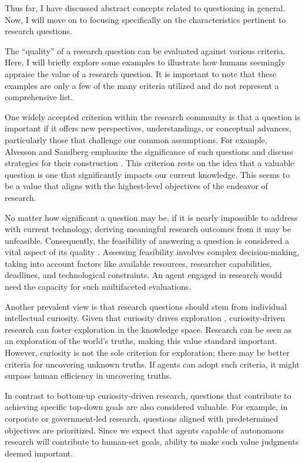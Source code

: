 \documentclass{article}
\begin{document}
Thus far, I have discussed abstract concepts related to questioning in general. Now, I will move on to focusing specifically on the characteristics pertinent to research questions.

The ``quality'' of a research question can be evaluated against various criteria. Here, I will briefly explore some examples to illustrate how humans seemingly appraise the value of a research question. It is important to note that these examples are only a few of the many criteria utilized and do not represent a comprehensive list. 

One widely accepted criterion within the research community is that a question is important if it offers new perspectives, understandings, or conceptual advances, particularly those that challenge our common assumptions. For example, Alvesson and Sandberg emphasize the significance of such questions and discuss strategies for their construction \cite{alvesson2013constructing}. This criterion rests on the idea that a valuable question is one that significantly impacts our current knowledge. This seems to be a value that aligns with the highest-level objectives of the endeavor of research.

No matter how significant a question may be, if it is nearly impossible to address with current technology, deriving meaningful research outcomes from it may be unfeasible. Consequently, the feasibility of answering a question is considered a vital aspect of its quality \cite{hulley2007designing,alon2009choose,huntington2021effect}. Assessing feasibility involves complex decision-making, taking into account factors like available resources, researcher capabilities, deadlines, and technological constraints. An agent engaged in research would need the capacity for such multifaceted evaluations.

Another prevalent view is that research questions should stem from individual intellectual curiosity. Given that curiosity drives exploration \cite{oudeyer2018computational}, curiosity-driven research can foster exploration in the knowledge space. Research can be seen as an exploration of the world's truths, making this value standard important. However, curiosity is not the sole criterion for exploration; there may be better criteria for uncovering unknown truths. If agents can adopt such criteria, it might surpass human efficiency in uncovering truths.

In contrast to bottom-up curiosity-driven research, questions that contribute to achieving specific top-down goals are also considered valuable. For example, in corporate or government-led research, questions aligned with predetermined objectives are prioritized. Since we expect that agents capable of autonomous research will contribute to human-set goals, ability to make such value judgments deemed important.
\end{document}
